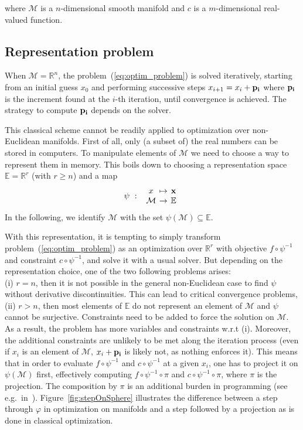 where $\mathcal{M}$ is a $n$-dimensional smooth manifold and $c$ is a $m$-dimensional real-valued function.

\subsection{Representation problem}
When $\mathcal{M} = \mathbb{R}^n$, the problem~(\ref{eq:optim_problem}) is solved iteratively, starting from an initial guess $x_0$ and performing successive steps $x_{i+1} = x_i + {\bf p_i}$ where ${\bf p_i}$ is the increment found at the $i$-th iteration, until convergence is achieved.
The strategy to compute ${\bf p_i}$ depends on the solver.

This classical scheme cannot be readily applied to optimization over non-Euclidean manifolds.
First of all, only (a subset of) the real numbers can be stored in computers.
To manipulate elements of $\mathcal{M}$ we need to choose a way to represent them in memory.
This boils down to choosing a representation space $\mathbb{E} = \mathbb{R}^r$ (with $r \geq n$) and a map
\begin{equation}
  \psi\ :\
  \begin{array}{ccc}
    x & \reduce{\mapsto}{6} & \mathbf{x} \\
    \mathcal{M} & \reduce{\rightarrow}{6} & \mathbb{E}
  \end{array}\nonumber%
\end{equation}
In the following, we identify $\mathcal{M}$ with the set $\psi(\mathcal{M}) \subseteq \mathbb{E}$.

With this representation, it is tempting to simply transform problem~(\ref{eq:optim_problem}) as an optimization over $\mathbb{R}^r$ with objective $f \circ \psi^{-1}$ and constraint $c \circ \psi^{-1}$, and solve it with a usual solver.
But depending on the representation choice, one of the two following problems arises:\\
(i) $r=n$, then it is not possible in the general non-Euclidean case to find $\psi$ without derivative discontinuities.
This can lead to critical convergence problems, \\
(ii) $r>n$, then most elements of $\mathbb{E}$ do not represent an element of $\mathcal{M}$ %
and $\psi$ cannot be surjective.
Constraints need to be added to force the solution on $\mathcal{M}$.
As a result, the problem has more variables and constraints w.r.t (i).
Moreover, the additional constraints are unlikely to be met along the iteration process (even if $x_i$ is an element of $\mathcal{M}$, $x_i+{\bf p_i}$ is likely not, as nothing enforces it).
This means that in order to evaluate $f \circ \psi^{-1}$ and $c \circ \psi^{-1}$ at a given $x_i$, one has to project it on $\psi(\mathcal{M})$ first, effectively computing $f \circ \psi^{-1} \circ \pi$ and $c \circ \psi^{-1} \circ \pi$, where $\pi$ is the projection.
The composition by $\pi$ is an additional burden in programming (see e.g.\ in~\cite{bouyarmane:humanoids:2012a}).
Figure~\ref{fig:stepOnSphere} illustrates the difference between a step through $\varphi$ in optimization on manifolds and a step followed by a projection as is done in classical optimization.

